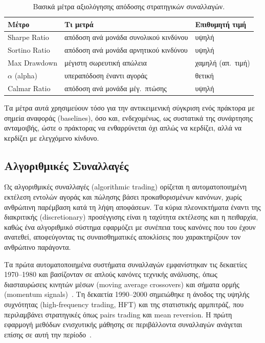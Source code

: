 \begin{table}[ht]
    \centering
    \caption{Βασικά μέτρα αξιολόγησης απόδοσης στρατηγικών συναλλαγών.}
    \label{tab:metrics}
    \begin{tabular}{@{}lll@{}}
        \toprule
        \textbf{Μέτρο} & \textbf{Τι μετρά} & \textbf{Επιθυμητή τιμή} \\
        \midrule
        Sharpe Ratio & απόδοση ανά μονάδα συνολικού κινδύνου & υψηλή \\
        Sortino Ratio & απόδοση ανά μονάδα αρνητικού κινδύνου & υψηλή \\
        Max Drawdown & μέγιστη σωρευτική απώλεια & χαμηλή (απ.\ τιμή) \\
        $\alpha$ (alpha) & υπεραπόδοση έναντι αγοράς & θετική \\
        Calmar Ratio & απόδοση ανά μονάδα μέγ.\ πτώσης & υψηλή \\
        \bottomrule
    \end{tabular}
\end{table}

Τα μέτρα αυτά χρησιμεύουν τόσο για την αντικειμενική σύγκριση ενός πράκτορα
με σημεία αναφοράς (baselines), όσο και, ενδεχομένως, ως συστατικά της
συνάρτησης ανταμοιβής, ώστε ο πράκτορας να ενθαρρύνεται όχι απλώς να κερδίζει,
αλλά να κερδίζει με ελεγχόμενο κίνδυνο.


\subsection{Αλγοριθμικές Συναλλαγές}
\label{subsec:algo-trading}

Ως αλγοριθμικές συναλλαγές (algorithmic trading) ορίζεται η αυτοματοποιημένη εκτέλεση
εντολών αγοράς και πώλησης βάσει προκαθορισμένων κανόνων, χωρίς ανθρώπινη παρέμβαση
κατά τη λήψη αποφάσεων. Τα κύρια πλεονεκτήματα έναντι της διακριτικής (discretionary)
προσέγγισης είναι η ταχύτητα εκτέλεσης και η πειθαρχία, καθώς ένα αλγοριθμικό σύστημα
εφαρμόζει με συνέπεια τους κανόνες που του έχουν ανατεθεί, αποφεύγοντας τις
συναισθηματικές αποκλίσεις που χαρακτηρίζουν τον ανθρώπινο παράγοντα.

Τα πρώτα αυτοματοποιημένα συστήματα συναλλαγών εμφανίστηκαν τις δεκαετίες 1970--1980
και βασίζονταν σε απλούς κανόνες τεχνικής ανάλυσης, όπως διασταυρώσεις κινητών μέσων
(moving average crossovers) και σήματα ορμής (momentum signals)~\cite{harris2003trading}.
Τη δεκαετία 1990--2000 σημειώθηκε η άνοδος της υψηλής συχνότητας (high-frequency
trading, HFT) και της στατιστικής αρμπιτράζ, που περιλαμβάνει στρατηγικές όπως
pairs trading και mean reversion. Η πρώτη εφαρμογή μεθόδων ενισχυτικής μάθησης σε
περιβάλλοντα συναλλαγών ανάγεται επίσης σε αυτή την περίοδο~\cite{neuneier1996asset}.

